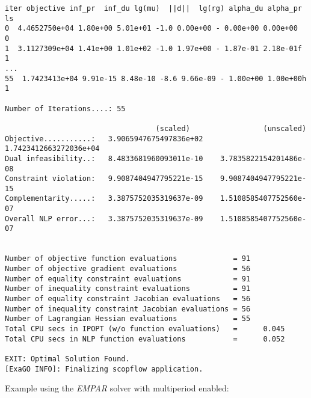 \begin{lstlisting}
iter objective inf_pr  inf_du lg(mu)  ||d||  lg(rg) alpha_du alpha_pr  ls
0  4.4652750e+04 1.80e+00 5.01e+01 -1.0 0.00e+00 - 0.00e+00 0.00e+00   0
1  3.1127309e+04 1.41e+00 1.01e+02 -1.0 1.97e+00 - 1.87e-01 2.18e-01f  1
...
55  1.7423413e+04 9.91e-15 8.48e-10 -8.6 9.66e-09 - 1.00e+00 1.00e+00h  1

Number of Iterations....: 55

                                   (scaled)                 (unscaled)
Objective...........:   3.9065947675497836e+02    1.7423412663272036e+04
Dual infeasibility..:   8.4833681960093011e-10    3.7835822154201486e-08
Constraint violation:   9.9087404947795221e-15    9.9087404947795221e-15
Complementarity.....:   3.3875752035319637e-09    1.5108585407752560e-07
Overall NLP error...:   3.3875752035319637e-09    1.5108585407752560e-07


Number of objective function evaluations             = 91
Number of objective gradient evaluations             = 56
Number of equality constraint evaluations            = 91
Number of inequality constraint evaluations          = 91
Number of equality constraint Jacobian evaluations   = 56
Number of inequality constraint Jacobian evaluations = 56
Number of Lagrangian Hessian evaluations             = 55
Total CPU secs in IPOPT (w/o function evaluations)   =      0.045
Total CPU secs in NLP function evaluations           =      0.052

EXIT: Optimal Solution Found.
[ExaGO INFO]: Finalizing scopflow application.
\end{lstlisting}

Example using the \emph{EMPAR} solver with multiperiod enabled:

